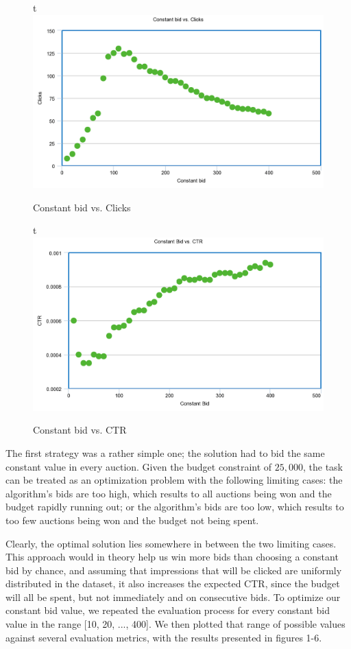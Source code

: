 \documentclass{sig-alternate-05-2015}
\begin{document}
\begin{figure}{t}
  \includegraphics[width=\linewidth]{constant_clicks.png}
  \caption{Constant bid vs. Clicks}
  \label{fig:clicks}
\end{figure}

\begin{figure}{t}
  \includegraphics[width=\linewidth]{constant_ctr.png}
  \caption{Constant bid vs. CTR}
  \label{fig:CPM}
\end{figure}

The first strategy was a rather simple one; the solution had to bid the same constant value in every auction. Given the budget constraint of $25,000$, the task can be treated as an optimization problem with the following limiting cases: the algorithm's bids are too high, which results to all auctions being won and the budget rapidly running out; or the algorithm's bids are too low, which results to too few auctions being won and the budget not being spent.

Clearly, the optimal solution lies somewhere in between the two limiting cases. This approach would in theory help us win more bids than choosing a constant bid by chance, and assuming that impressions that will be clicked are uniformly distributed in the dataset, it also increases the expected CTR, since the budget will all be spent, but not immediately and on consecutive bids. To optimize our constant bid value, we repeated the evaluation process for every constant bid value in the range [10, 20, ..., 400]. We then plotted that range of possible values against several evaluation metrics, with the results presented in figures 1-6.
\end{document}
